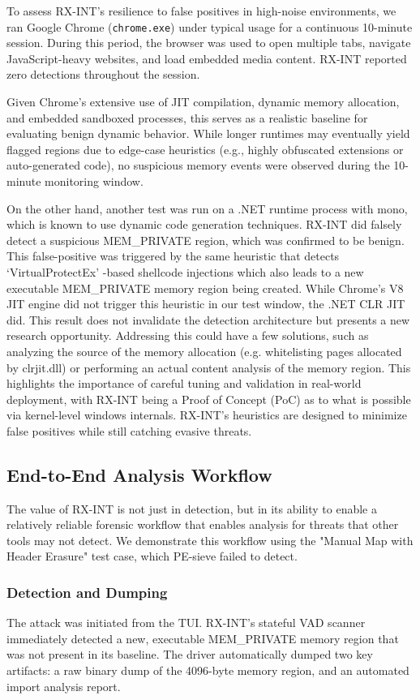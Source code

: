 \documentclass[journal]{IEEEtran}
\begin{document}
To assess RX-INT's resilience to false positives in high-noise environments, we ran Google Chrome (\texttt{chrome.exe}) under typical usage for a continuous 10-minute session. During this period, the browser was used to open multiple tabs, navigate JavaScript-heavy websites, and load embedded media content. RX-INT reported zero detections throughout the session. 

Given Chrome's extensive use of JIT compilation, dynamic memory allocation, and embedded sandboxed processes, this serves as a realistic baseline for evaluating benign dynamic behavior. While longer runtimes may eventually yield flagged regions due to edge-case heuristics (e.g., highly obfuscated extensions or auto-generated code), no suspicious memory events were observed during the 10-minute monitoring window. 

On the other hand, another test was run on a .NET runtime process with mono, which is known to use dynamic code generation techniques. RX-INT did falsely detect a suspicious MEM\_PRIVATE region, which was confirmed to be benign. 
This false-positive was triggered by the same heuristic that detects `VirtualProtectEx' -based shellcode injections which also leads to a new executable MEM\_PRIVATE memory region being created. While Chrome's V8 JIT engine did not trigger this heuristic in our test window, the .NET CLR JIT did. This result does not invalidate the detection architecture but presents a new research opportunity. Addressing this could have a few solutions, such as analyzing the source of the memory allocation (e.g. whitelisting pages allocated by clrjit.dll) or performing an actual content analysis of the memory region. This highlights the importance of careful tuning and validation in real-world deployment, with RX-INT being a Proof of Concept (PoC) as to what is possible via kernel-level windows internals. RX-INT's heuristics are designed to minimize false positives while still catching evasive threats.


\subsection{End-to-End Analysis Workflow}
The value of RX-INT is not just in detection, but in its ability to enable a relatively reliable forensic workflow that enables analysis for threats that other tools may not detect. We demonstrate this workflow using the "Manual Map with Header Erasure" test case, which PE-sieve failed to detect.
\subsubsection{Detection and Dumping}
The attack was initiated from the TUI. RX-INT's stateful VAD scanner immediately detected a new, executable MEM\_PRIVATE memory region that was not present in its baseline. The driver automatically dumped two key artifacts: a raw binary dump of the 4096-byte memory region, and an automated import analysis report.
\end{document}

